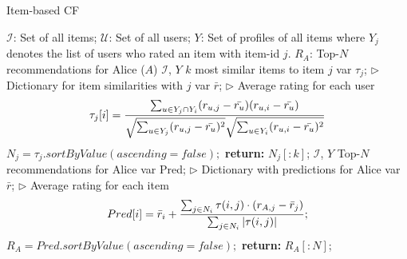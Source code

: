 \begin{algorithm}[ht]
\caption{Item-based CF}\label{ib_cf}
\begin{algorithmic}[1]
\Require $\mathcal{I}$: Set of all items; $\mathcal{U}$: Set of all users; $Y$: Set of profiles of all items where $Y_j$ denotes the list of users who rated an item with item-id $j$.
\Ensure $R_A$: Top-$N$ recommendations for Alice ($A$)
\Require $\mathcal{I}$, $Y$
\Ensure $k$ most similar items to item $j$
\State var $\tau_j$;		\hfill $\rhd$ Dictionary for item similarities with $j$
\State var $\bar{r}$; \hfill $\rhd$ Average rating for each user
\State \vspace{-4mm}
\begin{equation}
\vspace{-2mm}
\label{tau_ib_cf}
\tau_j[i]=\frac{\sum _{u \in Y_j \cap Y_i} (r_{u,j} - \bar{r_u})(r_{u,i} - \bar{r_u})}{\sqrt{\sum _{u \in Y_j} (r_{u,j} - \bar{r_u})^2}\sqrt{\sum _{u \in Y_i} (r_{u,i} - \bar{r_u})^2}}
\end{equation}
\EndFor
\State $N_{j}=\tau_j.sortByValue(ascending=false);$
\State \textbf{return:} $N_{j}[:k]$;
\Require $\mathcal{I}$, $Y$
\Ensure Top-$N$ recommendations for Alice
\State var Pred; \hfill $\rhd$ Dictionary with predictions for Alice
\State var $\bar{r}$; \hfill $\rhd$ Average rating for each item
\State \vspace{-4mm}
\begin{equation}
\vspace{-2mm}
\label{pred_ib_cf}
Pred[i]=\bar{r}_{i} +\frac{\sum_{j \in N_{i}} \tau(i,j) \cdot (r_{A,j}- \bar{r}_j)}{\sum_{j \in N_{i}} |\tau(i,j)| } ;
\end{equation}
\EndFor
\State $R_{A}=Pred.sortByValue(ascending=false);$
\State \textbf{return:} $R_{A}[:N]$;
\end{algorithmic}
\end{algorithm}

\vspace{-4mm}


